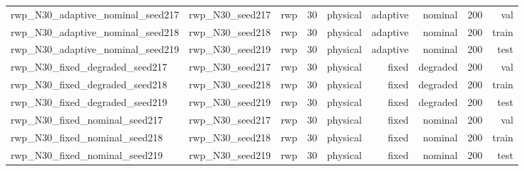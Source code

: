 \begin{tabular}{lrrrrrrrr}
rwp\_N30\_adaptive\_nominal\_seed217 & rwp\_N30\_seed217 & rwp & 30 & physical & adaptive & nominal & 200 & val \\
rwp\_N30\_adaptive\_nominal\_seed218 & rwp\_N30\_seed218 & rwp & 30 & physical & adaptive & nominal & 200 & train \\
rwp\_N30\_adaptive\_nominal\_seed219 & rwp\_N30\_seed219 & rwp & 30 & physical & adaptive & nominal & 200 & test \\
rwp\_N30\_fixed\_degraded\_seed217 & rwp\_N30\_seed217 & rwp & 30 & physical & fixed & degraded & 200 & val \\
rwp\_N30\_fixed\_degraded\_seed218 & rwp\_N30\_seed218 & rwp & 30 & physical & fixed & degraded & 200 & train \\
rwp\_N30\_fixed\_degraded\_seed219 & rwp\_N30\_seed219 & rwp & 30 & physical & fixed & degraded & 200 & test \\
rwp\_N30\_fixed\_nominal\_seed217 & rwp\_N30\_seed217 & rwp & 30 & physical & fixed & nominal & 200 & val \\
rwp\_N30\_fixed\_nominal\_seed218 & rwp\_N30\_seed218 & rwp & 30 & physical & fixed & nominal & 200 & train \\
rwp\_N30\_fixed\_nominal\_seed219 & rwp\_N30\_seed219 & rwp & 30 & physical & fixed & nominal & 200 & test \\
\bottomrule
\end{tabular}